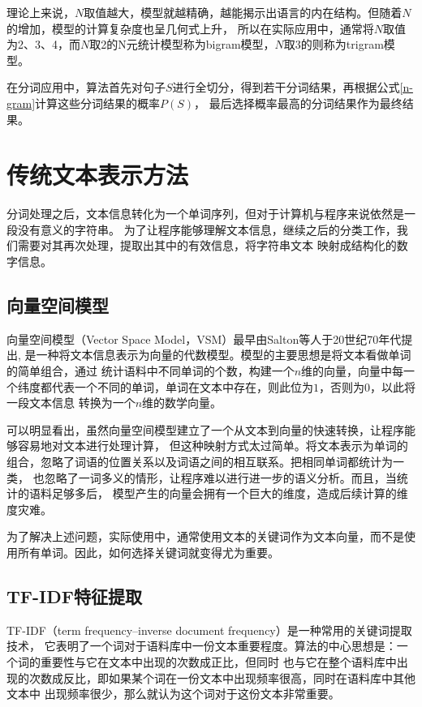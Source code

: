 \documentclass{standalone}
\begin{document}
理论上来说，$N$取值越大，模型就越精确，越能揭示出语言的内在结构。但随着$N$的增加，模型的计算复杂度也呈几何式上升，
所以在实际应用中，通常将$N$取值为2、3、4，而$N$取2的N元统计模型称为bigram模型，$N$取3的则称为trigram模型。

在分词应用中，算法首先对句子$S$进行全切分，得到若干分词结果，再根据公式\ref{n-gram}计算这些分词结果的概率$P\left ( S \right )$，
最后选择概率最高的分词结果作为最终结果。


\section{传统文本表示方法}
分词处理之后，文本信息转化为一个单词序列，但对于计算机与程序来说依然是一段没有意义的字符串。
为了让程序能够理解文本信息，继续之后的分类工作，我们需要对其再次处理，提取出其中的有效信息，将字符串文本
映射成结构化的数字信息。

\subsection{向量空间模型}

向量空间模型（Vector Space Model，VSM）最早由Salton等人于20世纪70年代提出,
是一种将文本信息表示为向量的代数模型。模型的主要思想是将文本看做单词的简单组合，通过
统计语料中不同单词的个数，构建一个$n$维的向量，向量中每一个纬度都代表一个不同的单词，单词在文本中存在，则此位为$1$，否则为$0$，以此将一段文本信息
转换为一个$n$维的数学向量。

可以明显看出，虽然向量空间模型建立了一个从文本到向量的快速转换，让程序能够容易地对文本进行处理计算，
但这种映射方式太过简单。将文本表示为单词的组合，忽略了词语的位置关系以及词语之间的相互联系。把相同单词都统计为一类，
也忽略了一词多义的情形，让程序难以进行进一步的语义分析。而且，当统计的语料足够多后，
模型产生的向量会拥有一个巨大的维度，造成后续计算的维度灾难。

为了解决上述问题，实际使用中，通常使用文本的关键词作为文本向量，而不是使用所有单词。因此，如何选择关键词就变得尤为重要。


\subsection{TF-IDF特征提取}

TF-IDF（term frequency–inverse document frequency）是一种常用的关键词提取技术，
它表明了一个词对于语料库中一份文本重要程度。算法的中心思想是：一个词的重要性与它在文本中出现的次数成正比，但同时
也与它在整个语料库中出现的次数成反比，即如果某个词在一份文本中出现频率很高，同时在语料库中其他文本中
出现频率很少，那么就认为这个词对于这份文本非常重要。
\end{document}
